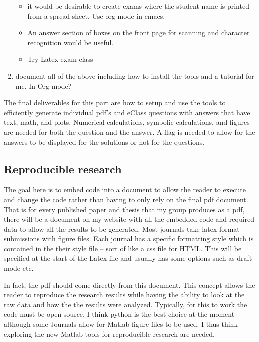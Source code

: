 \documentclass[12pt]{article}
\begin{document}
\begin{enumerate}
    \begin{itemize}
    \item  it would be desirable to create exams where the student name is printed from a spread sheet.  Use org mode in emacs.
    \item  An answer section of boxes on the front page for scanning and character recognition would be useful.
    \item  Try Latex exam class
  \end{itemize}
  \item document all of the above including how to install the tools and a tutorial for me. In Org mode?
\end{enumerate}

The final deliverables for this part are how to setup and use the tools to efficiently generate individual pdf's and eClass questions with answers that have text, math, and plots. Numerical calculations, symbolic calculations, and figures are needed for both the question and the answer. A flag is needed to allow for the answers to be displayed for the solutions or not for the questions.


\subsection{Reproducible research}

The goal here is to embed code into a document to allow the reader to execute and change the code rather than having to only rely on the final pdf document. That is for every published paper and thesis that my group produces as a pdf, there will be a document on my website with all the embedded code and required data to allow all the results to be generated. Most journals take latex format submissions with figure files. Each journal has a specific formatting style which is contained in the their style file -- sort of like a css file for HTML.  This will be specified at the start of the Latex file and usually has some options such as draft mode etc.


In fact, the pdf should come directly from this document. This concept allows the reader to reproduce the research results while having the ability to look at the raw data and how the the results were analyzed. Typically, for this to work the code must be open source. I think python is the best choice at the moment although some Journals allow for Matlab figure files to be used. I thus think exploring the new Matlab tools for reproducible research are needed.
\end{document}
